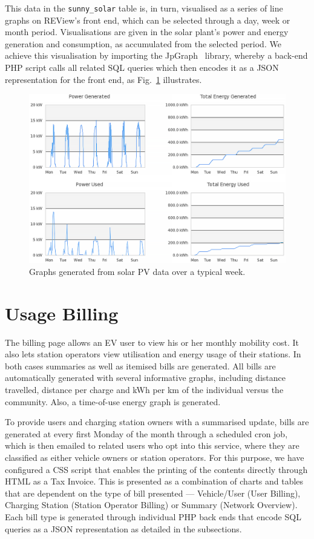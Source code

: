 
This data in the \texttt{sunny\_solar} table is, in turn, visualised as a series of line graphs on REView's front end, which can be selected through a day, week or month period. Visualisations are given in the solar plant's power and energy generation and consumption, as accumulated from the selected period. We achieve this visualisation by importing the JpGraph~\cite{asial_corporation_jpgraph_nodate} library, whereby a back-end PHP script calls all related SQL queries which then encodes it as a JSON representation for the front end, as Fig.~\ref{fig:9:solar} illustrates.

\begin{figure}[H]
	\centering
	\includegraphics[width=\linewidth]{solar}
	\caption{Graphs generated from solar PV data over a typical week.}
	\label{fig:9:solar}
\end{figure}

\section{Usage Billing}
\label{sec:9:ub}
The billing page allows an EV user to view his or her monthly mobility cost. It also lets station operators view utilisation and energy usage of their stations. In both cases summaries as well as itemised bills are generated. All bills are automatically generated with several informative graphs, including distance travelled, distance per charge and kWh per km of the individual versus the community. Also, a time-of-use energy graph is generated.

To provide users and charging station owners with a summarised update, bills are generated at every first Monday of the month through a scheduled cron job, which is then emailed to related users who opt into this service, where they are classified as either vehicle owners or station operators. For this purpose, we have configured a CSS script that enables the printing of the contents directly through HTML as a Tax Invoice. This is presented as a combination of charts and tables that are dependent on the type of bill presented --- Vehicle/User (User Billing), Charging Station (Station Operator Billing) or Summary (Network Overview). Each bill type is generated through individual PHP back ends that encode SQL queries as a JSON representation as detailed in the subsections.


